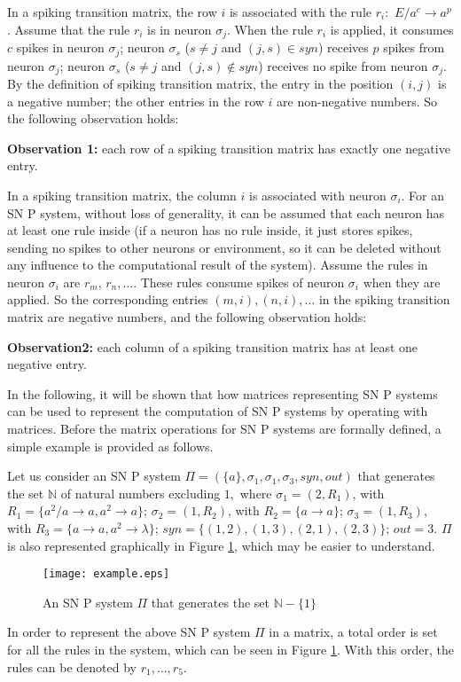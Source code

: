 \documentclass[runningheads]{llncs}
\begin{document}
In a spiking transition matrix, the row $i$ is associated with the
rule $r_i:$ $E/a^c\rightarrow a^p$. Assume that the rule $r_i$ is in
neuron $\sigma_j$. When the rule $r_i$ is applied, it consumes $c$
spikes in neuron $\sigma_j$; neuron $\sigma_s$ ($s\neq j$ and
$(j,s)\in syn$) receives $p$ spikes from neuron $\sigma_j$; neuron
$\sigma_s$ ($s\neq j$ and $(j,s)\notin syn$) receives no spike from
neuron $\sigma_j$. By the definition of spiking transition matrix,
the entry in the position $(i,j)$ is a negative number; the other
entries in the row $i$ are non-negative numbers. So the following
observation holds:

\smallskip
\textbf{Observation 1:} each row of a spiking transition matrix has
exactly one negative entry.
\smallskip

In a spiking transition matrix, the column $i$ is associated with
neuron $\sigma_i$.
 For an SN P system, without loss of generality,
 it can be assumed that each neuron has at least one rule inside
 (if a neuron has no rule inside, it just stores spikes, sending no spikes to other neurons or environment,
 so it can be deleted without any influence to
 the computational result of the system). Assume the rules in neuron $\sigma_i$ are $r_m$, $r_n, \dots$. These rules consume
 spikes of neuron $\sigma_i$ when they are applied. So the corresponding entries $(m,i), (n,i), \dots$ in the spiking
 transition matrix are negative
 numbers, and the following observation holds:

\smallskip
\textbf{Observation2:} each column of a spiking transition matrix
has at least one negative entry.
\smallskip

In the following, it will be shown that how matrices representing SN
P systems can be used to represent the computation of SN P systems
by operating with matrices. Before the matrix operations for SN P
systems are formally defined, a simple example is provided as
follows.
\begin{example}\label{ex1}
Let us consider an SN P system $\Pi=(\{a\},\sigma_1,\sigma_1,
\sigma_3, syn, out)$ that generates the set $\mathbb N$ of natural
numbers excluding $1,$ where $\sigma_1=(2,R_1)$, with
$R_1=\{a^2/a\rightarrow a, a^2\rightarrow a\}$; $\sigma_2=(1,R_2)$,
with $R_2=\{a\rightarrow a\}$; $\sigma_3=(1,R_3)$, with
$R_3=\{a\rightarrow a, a^2\rightarrow \lambda\}$;
$syn=\{(1,2),(1,3),(2,1),(2,3)\}$; $out=3$. $\Pi$ is also
represented graphically in Figure \ref{fig-ex1}, which may be easier
to understand.
\begin{figure}[htbp]
\centering
\texttt{[image: example.eps]}
          \caption{An SN P system $\Pi$ that generates the set $\mathbb N - \{1\}$}
          \label{fig-ex1}
       \end{figure}
\end{example}
In order to represent the above SN P system $\Pi$ in a matrix, a
total order is set for all the rules in the system, which can be
seen in Figure \ref{fig-ex1}. With this order, the rules can be
denoted by $r_1,\dots, r_5$.
\end{document}
